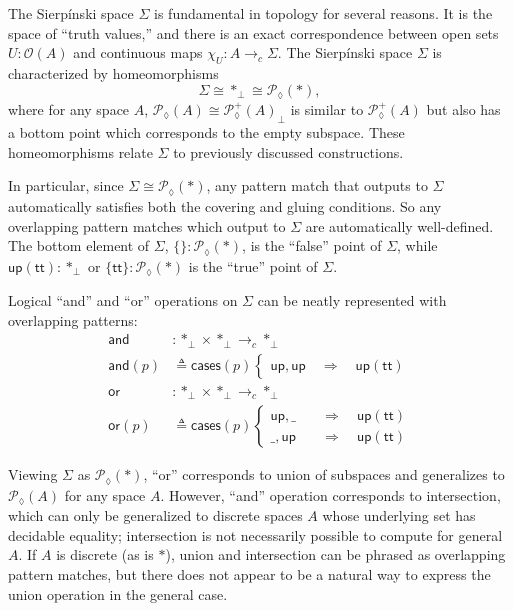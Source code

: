 \documentclass[conference]{IEEEtran}
\newcommand{\PLower}{\mathcal{P}_\lozenge}
\newcommand{\cto}{\to_c}
\newcommand{\One}{\ast}
\newcommand{\Open}[1]{\mathcal{O}({#1})}
\newcommand{\wildcard}{\_}
\newcommand{\Branch}{\Rightarrow}
\newcommand{\up}{\mathsf{up}}
\begin{document}
The Sierp\'inski space $\Sigma$ is fundamental in topology for several reasons. It is the space of ``truth values,'' and there is an exact correspondence between open sets $U : \Open{A}$ and continuous maps $\chi_U : A \cto \Sigma$. The Sierp\'inski space $\Sigma$ is characterized by homeomorphisms
\[
\Sigma \cong \One_\bot \cong \PLower(\One) ,
\]
where for any space $A$, $\PLower(A) \cong {\PLower^+(A)}_\bot$ is similar to $\PLower^+(A)$ but also has a bottom point which corresponds to the empty subspace. These homeomorphisms relate $\Sigma$ to previously discussed constructions.

In particular, since $\Sigma \cong \PLower(\One)$, any pattern match that outputs to $\Sigma$ automatically satisfies both the covering and gluing conditions. So any overlapping pattern matches which output to $\Sigma$ are automatically well-defined. The bottom element of $\Sigma$, $\{ \} : \PLower(\One)$, is the ``false'' point of $\Sigma$, while $\up(\mathsf{tt}) : \One_\bot$ or $\{ \mathsf{tt} \} : \PLower(\One)$ is the ``true'' point of $\Sigma$.

Logical ``and'' and ``or'' operations on $\Sigma$ can be neatly represented with overlapping patterns:
\begin{align*}
\mathsf{and} &: \One_\bot \times \One_\bot \cto \One_\bot
\\ \mathsf{and}(p) &\triangleq \mathsf{cases}(p)
\begin{cases}
\up , \up
  \quad \Branch \quad \up(\mathsf{tt})
\end{cases}
\\
\mathsf{or} &: \One_\bot \times \One_\bot \cto \One_\bot
\\ \mathsf{or}(p) &\triangleq \mathsf{cases}(p)
\begin{cases}
\up , \wildcard
  \quad &\Branch \quad \up(\mathsf{tt})
\\  \wildcard , \up
  \quad &\Branch \quad \up(\mathsf{tt})
\end{cases}
\end{align*}

Viewing $\Sigma$ as $\PLower(\One)$, ``or'' corresponds to union of subspaces and generalizes to $\PLower(A)$ for any space $A$. However, ``and'' operation corresponds to intersection, which can only be generalized to discrete spaces $A$ whose underlying set has decidable equality; intersection is not necessarily possible to compute for general $A$. If $A$ is discrete (as is $\One$), union and intersection can be phrased as overlapping pattern matches, but there does not appear to be a natural way to express the union operation in the general case.
\end{document}
